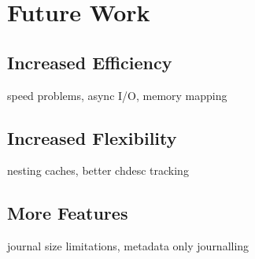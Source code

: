 \section{Future Work}
\label{sec:future}

\subsection{Increased Efficiency}
speed problems, async I/O, memory mapping

\subsection{Increased Flexibility}
nesting caches, better chdesc tracking

\subsection{More Features}
journal size limitations, metadata only journalling
